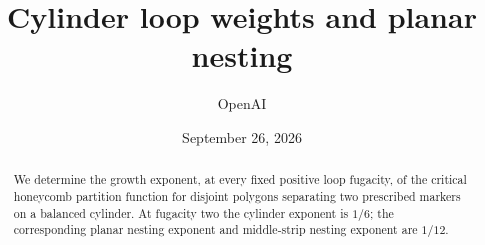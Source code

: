 \documentclass[11pt,oneside]{article}
\title{Cylinder loop weights and planar nesting}
\author{OpenAI}
\date{September 26, 2026}
\theoremstyle{definition}
\theoremstyle{remark}
\begin{document}
\maketitle
\begin{abstract}
We determine the growth exponent, at every fixed positive loop fugacity, of the critical honeycomb partition function for disjoint polygons separating two prescribed markers on a balanced cylinder. At fugacity two the cylinder exponent is $1/6$; the corresponding planar nesting exponent and middle-strip nesting exponent are $1/12$.
\end{abstract}
\tableofcontents









\clearpage
{}
{}

\end{document}
